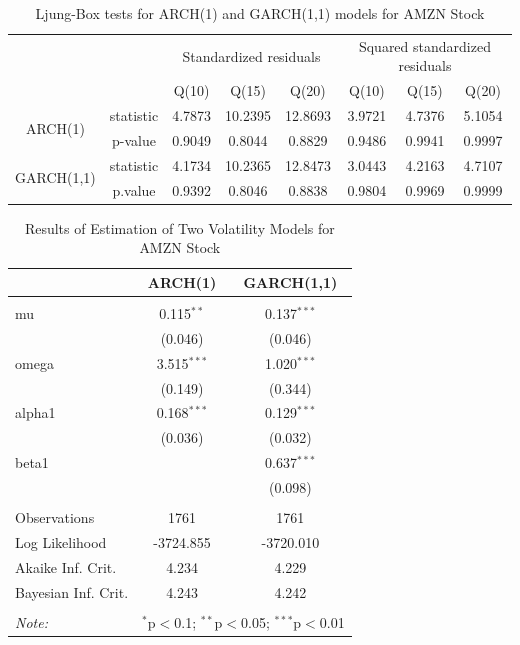 \documentclass[paper=a4, fontsize=13pt]{article}
\begin{document}
\begin{table}[!htbp] \centering 
  \caption{Ljung-Box tests for ARCH(1) and GARCH(1,1) models for AMZN Stock} 
  \label{lb_AMZN} 
\begin{tabular}{cc|cccccc} 
\\[-1.8ex]\hline 
\hline
& & \multicolumn{3}{c}{Standardized residuals} & \multicolumn{3}{c}{Squared standardized residuals} \\
& & Q(10) & Q(15) & Q(20) & Q(10) & Q(15) & Q(20) \\
\hline 
\multirow{2}{*}{ARCH(1)} & statistic & 4.7873 & 10.2395 & 12.8693 & 3.9721 & 4.7376 & 5.1054 \\
& p-value & 0.9049 & 0.8044 & 0.8829 & 0.9486 & 0.9941 & 0.9997 \\
\multirow{2}{*}{GARCH(1,1)} & statistic & 4.1734 & 10.2365 & 12.8473 & 3.0443 & 4.2163 & 4.7107 \\
& p.value & 0.9392 & 0.8046 & 0.8838 & 0.9804 & 0.9969 & 0.9999 \\
\hline
\hline 
\end{tabular} 
\end{table} 

\begin{table}[!htbp] \centering 
  \caption{Results of Estimation of Two Volatility Models for AMZN Stock} 
  \label{est_AMZN} 
\begin{tabular}{@{\extracolsep{5pt}}lcc} 
\\[-1.8ex]\hline 
\hline
 & ARCH(1) & GARCH(1,1) \\ 
\hline \\[-1.8ex] 
 mu & 0.115$^{**}$ & 0.137$^{***}$ \\ 
  & (0.046) & (0.046) \\ 
 omega & 3.515$^{***}$ & 1.020$^{***}$ \\ 
  & (0.149) & (0.344) \\ 
 alpha1 & 0.168$^{***}$ & 0.129$^{***}$ \\ 
  & (0.036) & (0.032) \\ 
 beta1 &  & 0.637$^{***}$ \\ 
  &  & (0.098) \\ 
\hline \\[-1.8ex] 
Observations & 1761 & 1761 \\ 
Log Likelihood & -3724.855 & -3720.010 \\ 
Akaike Inf. Crit. & 4.234 & 4.229 \\ 
Bayesian Inf. Crit. & 4.243 & 4.242 \\ 
\hline 
\hline \\[-1.8ex] 
\textit{Note:}  & \multicolumn{2}{r}{$^{*}$p$<$0.1; $^{**}$p$<$0.05; $^{***}$p$<$0.01} \\ 
\end{tabular} 
\end{table} 
\end{document}
